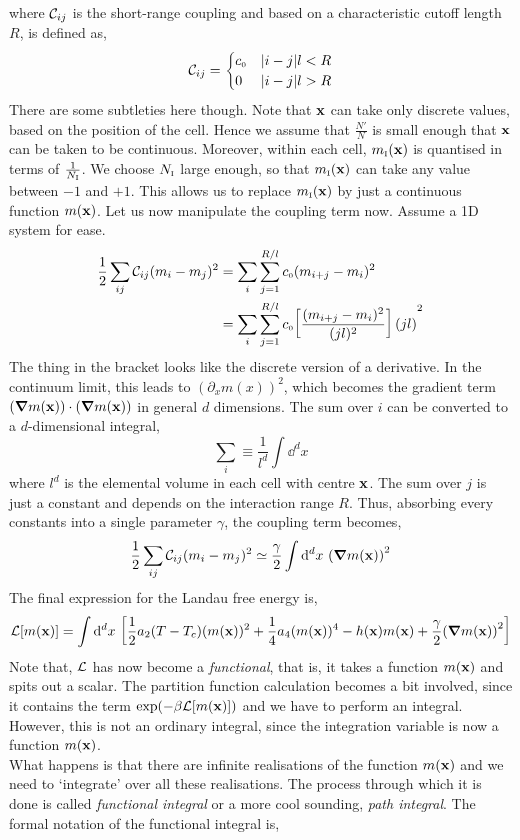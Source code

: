 where $\mathcal C_{ij}$ is the short-range coupling and based on a characteristic cutoff length $R$, is defined as,
$$\mathcal C_{ij} = \begin{cases}
    c_{\text{\tiny 0}} & \abs{i-j}l<R \\
    0 & \abs{i-j}l>R
\end{cases}$$
There are some subtleties here though. Note that $\vb{x}$ can take only discrete values, based on the position of the cell. Hence we assume that $\frac{N'}{N}$ is small enough that $\vb{x}$ can be taken to be continuous. Moreover, within each cell, $m_{\text{\tiny I}}(\vb{x}) $ is quantised in terms of $\frac{1}{N_{\text{\tiny I}}}$. We choose $N_{\text{\tiny I}}$ large enough, so that $m_{\text{\tiny I}}(\vb{x})$ can take any value between $-1$ and $+1$. This allows us to replace $m_{\text{\tiny I}}(\vb{x})$ by just a continuous function $m(\vb{x})$. Let us now manipulate the coupling term now. Assume a 1D system for ease.
\begin{align}
   \begin{split}
     \frac{1}{2}\sum\limits_{ij}\mathcal C_{ij}(m_i-m_j)^2 &= \sum\limits_i \sum\limits_{j=1}^{R/l} c_{\text{\tiny 0}} (m_{i+j}-m_i)^2 \\
    &=\sum\limits_i \sum\limits_{j=1}^{R/l} c_{\text{\tiny 0}}\qty[ \frac{(m_{i+j}-m_i)^2}{(jl)^2}] (jl)^2\\
   \end{split}
\end{align}
The thing in the bracket looks like the discrete version of a derivative. In the continuum limit, this leads to $(\partial_x m(x))^2$, which becomes the gradient term $\qty(\grad m(\vb{x})) \cdot \qty(\grad m(\vb{x}))$ in general $d$ dimensions. The sum over $i$ can be converted to a $d$-dimensional integral,
$$\sum\limits_i \equiv \frac{1}{l^d}\int \dd^d x$$
where $l^d$ is the elemental volume in each cell with centre $\vb{x}$. The sum over $j$ is just a constant and depends on the interaction range $R$. Thus, absorbing every constants into a single parameter $\gamma$, the coupling term becomes, 
\begin{equation*}
      \frac{1}{2}\sum\limits_{ij}\mathcal C_{ij}(m_i-m_j)^2 \simeq \frac{\gamma}{2} \int \dd^d x\ \qty(\grad m(\vb{x}))^2
\end{equation*}
The final expression for the Landau free energy is,
\begin{equation}
    \SL[m(\vb{x})] = \int \dd^d x \ \qty[\frac{1}{2}a_2(T-T_c)(m(\vb{x}))^2 + \frac{1}{4}a_4 (m(\vb{x}))^4 - h(\vb{x})m(\vb{x}) +\frac{\gamma}{2}\qty(\grad m(\vb{x}))^2]
\end{equation}
Note that, $\mathcal L$ has now become a \textit{functional}, that is, it takes a function $m(\vb{x})$ and spits out a scalar. The partition function calculation becomes a bit involved, since it contains the term $\exp(-\beta \mathcal L[m(\vb{x})])$ and we have to perform an integral. However, this is not an ordinary integral, since the integration variable is now a function $m(\vb{x})$.\\[0.2cm] What happens is that there are infinite realisations of the function $m(\vb{x})$ and we need to `integrate' over all these realisations. The process through which it is done is called \textit{functional integral} or a more cool sounding, \textit{path integral}. The formal notation of the functional integral is, 
